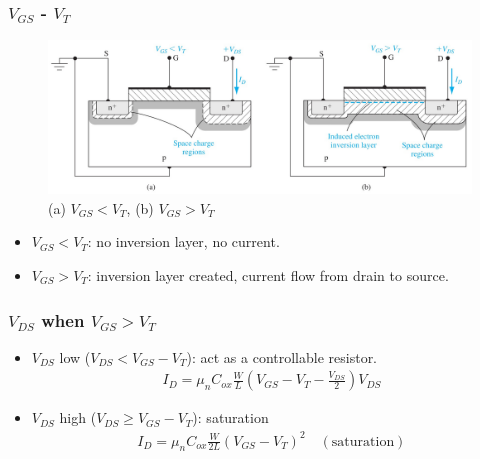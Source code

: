 \documentclass{beamer}
\begin{document}
    \begin{frame} \frametitle{$V_{GS}$ - $V_{T} $}
        \begin{figure}[H]
            \centering
            \includegraphics[width=0.9\linewidth]{Current-voltage-relationship.jpg}
            \caption{(a) $V_{GS} < V_T$, (b) $V_{GS} > V_T$}
            \label{fig:Current-voltage-relationship.jpg}
        \end{figure}
        \begin{itemize}
            \item $V_{GS} < V_T$: no inversion layer, no current.
            \item $V_{GS} > V_T$: inversion layer created, current flow from drain to source.
        \end{itemize}
    \end{frame}

    \begin{frame} \frametitle{$V_{DS} $ when $V_{GS} > V_{T} $}
        \begin{itemize}
            \item $V_{DS} $ low ($V_{DS} < V_{GS} - V_T$): act as a controllable resistor.
            \begin{equation*}
                \begin{aligned}
                    \boxed{I_D = \mu_n C_{ox} \frac{W}{L} \left( V_{GS}  - V_T - \frac{V_{DS}}{2}  \right) V_{DS}}
                \end{aligned}
            \end{equation*}
            \item $V_{DS}$ high ($V_{DS} \ge V_{GS} - V_T $): saturation
            \begin{equation*}
                \begin{aligned}
                    \boxed{I_D = \mu_n C_{ox} \frac{W}{2L} \left( V_{GS} - V_T \right)^2 \quad (\text{saturation})}
                \end{aligned}
            \end{equation*}
        \end{itemize}
    \end{frame}
\end{document}
